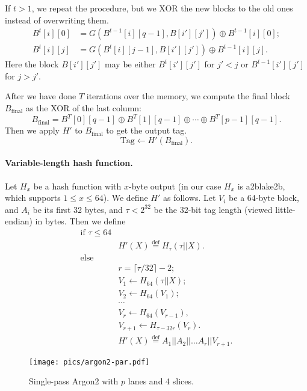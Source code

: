 \documentclass[a4paper]{article}
\begin{document}
If $t>1$, we repeat the procedure, but we XOR the new blocks to the old ones instead of overwriting them. 
\begin{align*}
B^t[i][0] &=G(B^{t-1}[i][q-1], B[i'][j']) \oplus B^{t-1}[i][0];\\
B^t[i][j] &= G(B^{t}[i][j-1], B[i'][j'])\oplus B^{t-1}[i][j].
\end{align*}
Here the block $B[i'][j']$ may be either $B^t[i'][j']$ for $j'<j$ or $B^{t-1}[i'][j']$ for $j>j'$.

After we have done  $T$ iterations over the memory, we compute the final block $B_{\mathrm{final}}$ as the XOR of the last column:
$$
B_{\mathrm{final}} = B^T[0][q-1] \oplus B^T[1][q-1]\oplus \cdots\oplus B^T[p-1][q-1].
$$
Then we apply $H'$ to $B_{\mathrm{final}}$ to get the output tag.
$$
\text{Tag} \leftarrow H'(B_{\mathrm{final}}).
$$


\paragraph{Variable-length hash function.} Let $H_x$ be a hash function with $x$-byte output (in our case $H_x$ is a2blake2b, which supports $1\leq x \leq 64$). We define $H'$ as follows. Let $V_i$ be a 64-byte block, and  $A_i$ be its first 32 bytes,
and $\tau<2^{32}$ be the 32-bit tag length (viewed little-endian) in bytes. 
Then we define
$$
\begin{array}{rl}
\text{if }\tau \leq 64&\\& H'(X) \overset{\text{def}}{=} H_{\tau}(\tau ||X).\\
\text{else}&\\
& r = \lceil\tau/32\rceil-2;\\
&V_1\leftarrow H_{64}(\tau||X);\\
&V_2 \leftarrow H_{64}(V_1);\\
&\cdots\\
&V_r  \leftarrow H_{64}(V_{r-1}),\\
&V_{r+1} \leftarrow H_{\tau - 32r}(V_{r}).\\
&H'(X) \overset{\text{def}}{=} A_1||A_2||\ldots A_r||V_{r+1}.
\end{array}
$$

 \begin{figure}[ht]
  \ifpdf
\begin{center}
  \texttt{[image: pics/argon2-par.pdf]}
  \caption{Single-pass \textsf{Argon2} with $p$ lanes and 4 slices. }\label{fig:argon2}
\end{center}
\fi
  \end{figure}
\end{document}
